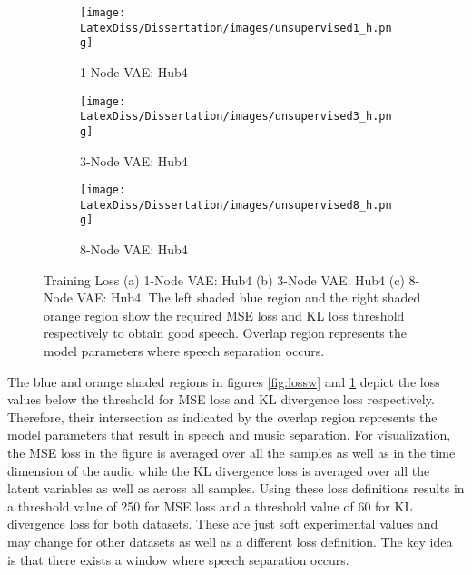 \begin{figure}[h!]
    \begin{subfigure}{0.4\textwidth}
    \centering
    \texttt{[image: LatexDiss/Dissertation/images/unsupervised1\_h.png]}
    \caption{1-Node VAE: Hub4}
    \end{subfigure}
    \vspace{0pt} \newline
    \begin{subfigure}{0.4\textwidth}
    \centering
    \texttt{[image: LatexDiss/Dissertation/images/unsupervised3\_h.png]}
    \caption{3-Node VAE: Hub4}
    \end{subfigure}
    \vspace{0pt} \newline
    \begin{subfigure}{0.4\textwidth}
    \centering
    \texttt{[image: LatexDiss/Dissertation/images/unsupervised8\_h.png]}
    \caption{8-Node VAE: Hub4}
    \end{subfigure}
    \caption{Training Loss (a) 1-Node VAE: Hub4  (b) 3-Node VAE: Hub4 (c) 8-Node VAE: Hub4. The left shaded blue region and the right shaded orange region show the required MSE loss and KL loss threshold respectively to obtain good speech. Overlap region represents the model parameters where speech separation occurs.}
    \label{fig:lossh}
\end{figure}

The blue and orange shaded regions in figures \ref{fig:lossw} and \ref{fig:lossh} depict the loss values below the threshold for MSE loss and KL divergence loss respectively. Therefore, their intersection as indicated by the overlap region represents the model parameters that result in speech and music separation. For visualization, the MSE loss in the figure is averaged over all the samples as well as in the time dimension of the audio while the KL divergence loss is averaged over all the latent variables as well as across all samples. Using these loss definitions results in a threshold value of 250 for MSE loss and a threshold value of 60 for KL divergence loss for both datasets. These are just soft experimental values and may change for other datasets as well as a different loss definition. The key idea is that there exists a window where speech separation occurs. \\



